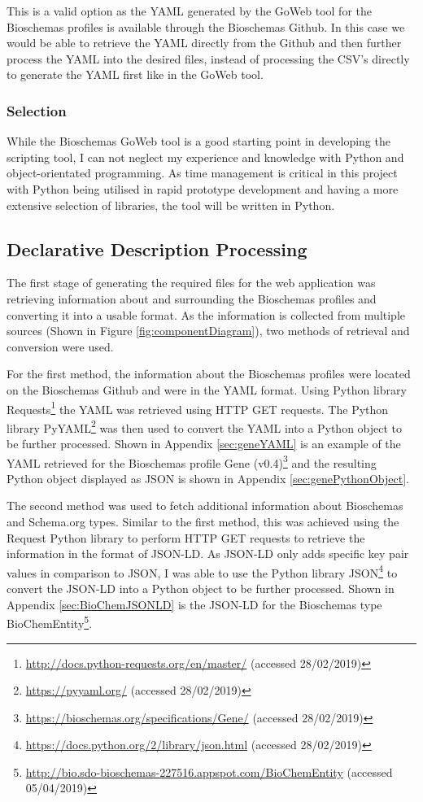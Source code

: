 This is a valid option as the YAML generated by the GoWeb tool for the Bioschemas profiles is available through the Bioschemas Github. In this case we would be able to retrieve the YAML directly from the Github and then further process the YAML into the desired files, instead of processing the CSV's directly to generate the YAML first like in the GoWeb tool.

\subsubsection{Selection}
While the Bioschemas GoWeb tool is a good starting point in developing the scripting tool, I can not neglect my experience and knowledge with Python and object-orientated programming. As time management is critical in this project with Python being utilised in rapid prototype development and having a more extensive selection of libraries, the tool will be written in Python.

\subsection{Declarative Description Processing}\label{sec:declarative}
The first stage of generating the required files for the web application was retrieving information about and surrounding the Bioschemas profiles and converting it into a usable format. As the information is collected from multiple sources (Shown in Figure \ref{fig:componentDiagram}), two methods of retrieval and conversion were used. 

For the first method, the information about the Bioschemas profiles were located on the Bioschemas Github and were in the YAML format. Using Python library Requests\footnote{\url{http://docs.python-requests.org/en/master/} (accessed 28/02/2019)} the YAML was retrieved using HTTP GET requests. The Python library PyYAML\footnote{\url{https://pyyaml.org/} (accessed 28/02/2019)} was then used to convert the YAML into a Python object to be further processed. Shown in Appendix \ref{sec:geneYAML} is an example of the YAML retrieved for the Bioschemas profile Gene (v0.4)\footnote{\url{https://bioschemas.org/specifications/Gene/} (accessed 28/02/2019)} and the resulting Python object displayed as JSON is shown in Appendix \ref{sec:genePythonObject}.

\newpage
The second method was used to fetch additional information about Bioschemas and Schema.org types. Similar to the first method, this was achieved  using the Request Python library to perform HTTP GET requests to retrieve the information in the format of JSON-LD. As JSON-LD only adds specific key pair values in comparison to JSON, I was able to use the Python library JSON\footnote{\url{https://docs.python.org/2/library/json.html} (accessed 28/02/2019)} to convert the JSON-LD into a Python object to be further processed. Shown in Appendix \ref{sec:BioChemJSONLD} is the JSON-LD for the Bioschemas type BioChemEntity\footnote{\url{http://bio.sdo-bioschemas-227516.appspot.com/BioChemEntity} (accessed 05/04/2019)}.

